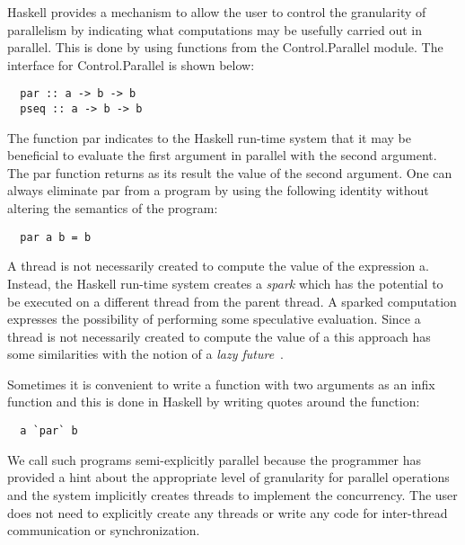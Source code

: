 \documentclass[twocolumn,9pt]{sigplanconf}
\newcommand{\codef}[1]{{\fontfamily{cmss}\small#1}}
\begin{document}
Haskell provides a mechanism to allow the user to control the granularity of parallelism by indicating what computations may be usefully carried out in parallel. This is done by using functions from the \codef{Control.Parallel} module. The interface for \codef{Control.Parallel} is shown below:
\begin{lstlisting}
  par :: a -> b -> b 
  pseq :: a -> b -> b 
\end{lstlisting}
The function \codef{par} indicates to the Haskell run-time system that it may be beneficial to evaluate the first argument in parallel with the second argument. The \codef{par} function returns as its result the value of the second argument. One can always eliminate \codef{par} from a program by using the following identity without altering the semantics of the program:
\begin{lstlisting}
  par a b = b 
\end{lstlisting}
A thread is not necessarily created to compute the value of the expression \codef{a}. Instead, the Haskell run-time system creates a {\em spark} which has the potential to be executed on a different thread from the parent thread. A sparked computation expresses the possibility of performing some speculative evaluation. Since a thread is not necessarily created to compute the value of \codef{a} this approach has some similarities with the notion of a {\em lazy future}~\cite{mohr:91}.

Sometimes it is convenient to write a function with two arguments as an infix function and this is done in Haskell by writing quotes around the function:
\begin{lstlisting}
  a `par` b
\end{lstlisting}

We call such programs semi-explicitly parallel because the programmer has provided a hint about the appropriate level of granularity for parallel operations and the system implicitly creates threads to implement the concurrency. The user does not need to explicitly create any threads or write any code for inter-thread communication or synchronization.
\end{document}
